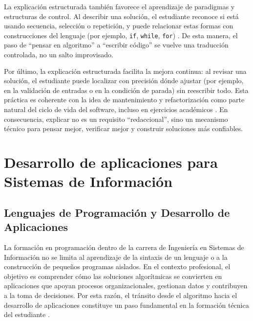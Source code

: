 \documentclass[12pt,twoside]{book}
\begin{document}
						La explicación estructurada también favorece el aprendizaje de paradigmas y estructuras de control. Al describir una solución, el estudiante reconoce si está usando secuencia, selección o repetición, y puede relacionar estas formas con construcciones del lenguaje (por ejemplo, \texttt{if}, \texttt{while}, \texttt{for}) \cite{Joyanes2007Fundamentos,Farrell2018Programming}. De esta manera, el paso de “pensar en algoritmo” a “escribir código” se vuelve una traducción controlada, no un salto improvisado.
						
						Por último, la explicación estructurada facilita la mejora continua: al revisar una solución, el estudiante puede localizar con precisión dónde ajustar (por ejemplo, en la validación de entradas o en la condición de parada) sin reescribir todo. Esta práctica es coherente con la idea de mantenimiento y refactorización como parte natural del ciclo de vida del software, incluso en ejercicios académicos \cite{Sommerville2015Software,Abid2020Years,Martin2008Clean}. En consecuencia, explicar no es un requisito “redaccional”, sino un mecanismo técnico para pensar mejor, verificar mejor y construir soluciones más confiables.
	
	\part{Desarrollo de aplicaciones para Sistemas de Información}
	
		
		\chapter{Lenguajes de Programación y Desarrollo de Aplicaciones}
			\noindent
			La formación en programación dentro de la carrera de Ingeniería en Sistemas de Información no se limita al aprendizaje de la sintaxis de un lenguaje o a la construcción de pequeños programas aislados. En el contexto profesional, el objetivo es comprender cómo las soluciones algorítmicas se convierten en aplicaciones que apoyan procesos organizacionales, gestionan datos y contribuyen a la toma de decisiones. Por esta razón, el tránsito desde el algoritmo hacia el desarrollo de aplicaciones constituye un paso fundamental en la formación técnica del estudiante \cite{Pressman2019Software,Sommerville2015Software,Laudon2020Management}.
			
\end{document}
